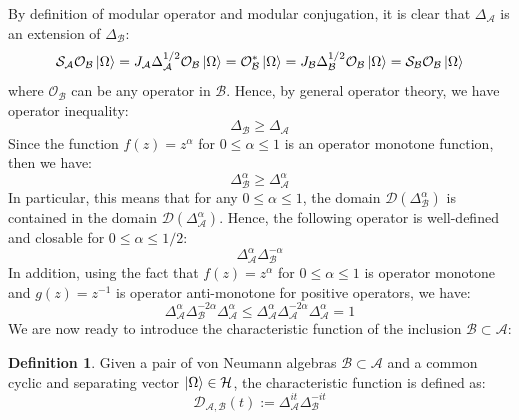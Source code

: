 \documentclass[a4paper,11pt]{article}
\theoremstyle{definition}
\newtheorem{definition}{Definition}[section]
\begin{document}
By definition of modular operator and modular conjugation, it is clear that $\Delta_\mathcal{A}$ is an extension of $\Delta_\mathcal{B}$:
\begin{equation}
    \mathcal{S}_\mathcal{A}\mathcal{O}_\mathcal{B}\ket{\Omega} = J_\mathcal{A}\Delta_\mathcal{A}^{1/2}\mathcal{O}_\mathcal{B}\ket{\Omega} = \mathcal{O}_\mathcal{B}^*\ket{\Omega} = J_\mathcal{B}\Delta_\mathcal{B}^{1/2}\mathcal{O}_\mathcal{B}\ket{\Omega} = \mathcal{S}_\mathcal{B}\mathcal{O}_\mathcal{B}\ket{\Omega}
\end{equation}
where $\mathcal{O}_\mathcal{B}$ can be any operator in $\mathcal{B}$. Hence, by general operator theory, we have operator inequality:
\begin{equation}
    \Delta_\mathcal{B}\geq \Delta_\mathcal{A}
\end{equation}
Since the function $f(z)  = z^\alpha$ for $0\leq \alpha\leq 1$ is an operator monotone function, then we have:
\begin{equation}
    \Delta_\mathcal{B}^\alpha \geq \Delta_\mathcal{A}^\alpha
\end{equation}
In particular, this means that for any $0\leq \alpha\leq 1$, the domain $\mathcal{D}(\Delta_\mathcal{B}^\alpha)$ is contained in the domain $\mathcal{D}(\Delta_\mathcal{A}^\alpha)$. Hence, the following operator is well-defined and closable for $0\leq \alpha\leq 1/2$:
\begin{equation}
    \Delta_\mathcal{A}^\alpha \Delta_\mathcal{B}^{-\alpha}
\end{equation}
In addition, using the fact that $f(z) = z^\alpha$ for $0\leq \alpha\leq 1$ is operator monotone and $g(z) = z^{-1}$ is operator anti-monotone for positive operators, we have:
\begin{equation}
    \Delta_\mathcal{A}^{\alpha}\Delta_\mathcal{B}^{-2\alpha}\Delta_{\mathcal{A}}^{\alpha} \leq \Delta_\mathcal{A}^\alpha\Delta_\mathcal{A}^{-2\alpha}\Delta_\mathcal{A}^\alpha = 1
\end{equation}
We are now ready to introduce the characteristic function of the inclusion $\mathcal{B}\subset\mathcal{A}$\cite{revolutionizing}:
\begin{definition}
    Given a pair of von Neumann algebras $\mathcal{B}\subset\mathcal{A}$ and a common cyclic and separating vector $\ket{\Omega}\in\mathcal{H}$, the characteristic function is defined as:
    \begin{equation}
        \mathcal{D}_{\mathcal{A}, \mathcal{B}}(t) := \Delta_\mathcal{A}^{it}\Delta_\mathcal{B}^{-it}
    \end{equation}
\end{definition}
\end{document}
